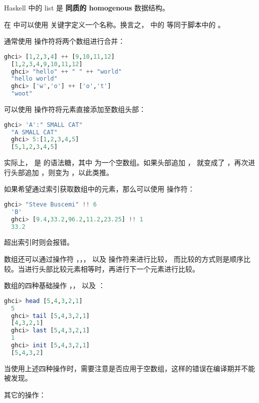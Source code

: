 \documentclass[./main.tex]{subfiles}
\begin{document}
Haskell 中的 list 是 \textbf{同质的 homogenous} 数据结构。

\begin{anote}
  在  中可以使用  关键字定义一个名称。换言之， 中的 
  等同于脚本中的 。
\end{anote}

通常使用 \acode{++} 操作符将两个数组进行合并：

\begin{lstlisting}[language=Haskell]
  ghci> [1,2,3,4] ++ [9,10,11,12]
  [1,2,3,4,9,10,11,12]
  ghci> "hello" ++ " " ++ "world"
  "hello world"
  ghci> ['w','o'] ++ ['o','t']
  "woot"
\end{lstlisting}

可以使用 \acode{:} 操作符将元素直接添加至数组头部：

\begin{lstlisting}[language=Haskell]
  ghci> 'A':" SMALL CAT"
  "A SMALL CAT"
  ghci> 5:[1,2,3,4,5]
  [5,1,2,3,4,5]
\end{lstlisting}

实际上，\acode{[1, 2, 3]} 是  的语法糖，其中 \acode{[]} 为一个空数组。如果头部追加 ，
\acode{[]} 就变成了 \acode{[3]}，再次进行头部追加 ，则变为 \acode{[2, 3]}，以此类推。

如果希望通过索引获取数组中的元素，那么可以使用 \acode{!!} 操作符：

\begin{lstlisting}[language=Haskell]
  ghci> "Steve Buscemi" !! 6
  'B'
  ghci> [9.4,33.2,96.2,11.2,23.25] !! 1
  33.2
\end{lstlisting}

超出索引时则会报错。

数组还可以通过操作符 \acode{<}，\acode{<=}，\acode{==}，\acode{>} 以及 \acode{>=} 操作符来进行比较，
而比较的方式则是顺序比较。当进行头部比较元素相等时，再进行下一个元素进行比较。

数组的四种基础操作 ，， 以及 ：

\begin{lstlisting}[language=Haskell]
  ghci> head [5,4,3,2,1]
  5
  ghci> tail [5,4,3,2,1]
  [4,3,2,1]
  ghci> last [5,4,3,2,1]
  1
  ghci> init [5,4,3,2,1]
  [5,4,3,2]
\end{lstlisting}

当使用上述四种操作时，需要注意是否应用于空数组，这样的错误在编译期并不能被发现。

其它的操作：
\end{document}

